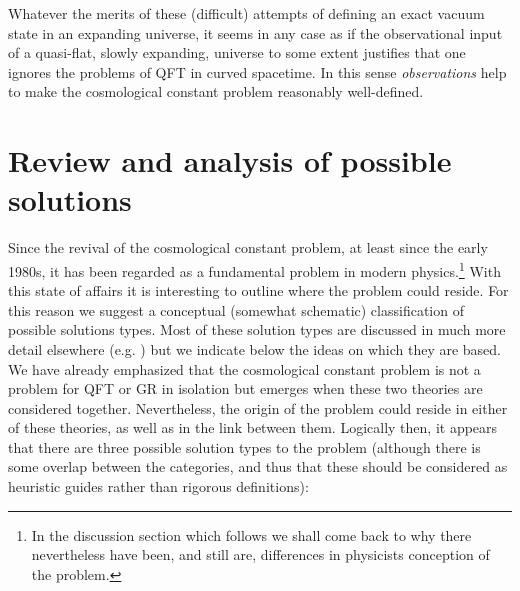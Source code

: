 \documentclass[12pt]{article}
\def\s{\section}
\begin{document}
Whatever the merits of these (difficult) attempts of defining an
exact vacuum state in an expanding universe, it seems in any case
as if the observational input of a quasi-flat, slowly expanding,
universe to some extent justifies that one ignores the problems of
QFT in curved spacetime. In this sense {\em observations} help to make
the cosmological constant problem reasonably well-defined.\\

\s{Review and analysis of possible solutions}

Since the revival of the cosmological constant problem, at least
since the early 1980s, it has been regarded as a fundamental
problem in modern physics.\footnote{In the discussion section
which follows we shall come back to why there nevertheless have
been, and still are, differences in physicists conception of the
problem.} With this state of affairs it is interesting to outline
where the problem could reside. For this reason we suggest a
conceptual (somewhat schematic) classification of possible
solutions types. Most of these solution types are discussed in
much more detail elsewhere (e.g. \cite{Weinberg89,sahni99}) but
we indicate below the ideas on which they are based. We have
already emphasized that the cosmological constant problem is not a
problem for QFT or GR in isolation but emerges when these two
theories are considered together. Nevertheless, the origin of the
problem could reside in either of these theories, as well as in
the link between them. Logically then, it appears that there are
three possible solution types to the problem (although there is
some overlap between the categories, and thus that these should be
considered as heuristic guides rather than rigorous definitions):
\\
\end{document}

